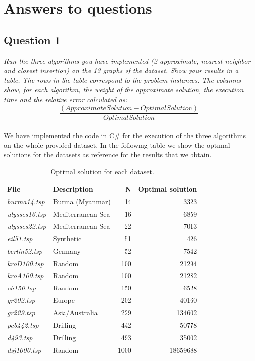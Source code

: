\section{Answers to questions}

\subsection{Question 1}
\textit{Run the three algorithms you have implemented (2-approximate, nearest neighbor and closest insertion) on the 13 graphs of the dataset. Show your results in a table. The rows in the table correspond to the problem instances. The columns show, for each algorithm, the weight of the approximate solution, the execution time and the relative error calculated as:
\[\frac{(ApproximateSolution - OptimalSolution)}{OptimalSolution}\]}\\

\noindent
We have implemented the code in C\# for the execution of the three algorithms on the whole provided dataset.
In the following table we show the optimal solutions for the datasets as reference for the results that we obtain.
\begin{table}[H]\centering
    \begin{tabular}{|l|l|r|r|}
    \hline
    \textbf{File} & \textbf{Description} & \textbf{N} & \textbf{Optimal solution} \\
    \hline
    \textit{burma14.tsp}	    & Burma (Myanmar)	& 14	& 3323 \\
    \textit{ulysses16.tsp}      & Mediterranean Sea & 16	& 6859 \\
    \textit{ulysses22.tsp}      & Mediterranean Sea & 22	& 7013 \\
    \textit{eil51.tsp}          & Synthetic	        & 51	& 426 \\
    \textit{berlin52.tsp}	    & Germany	        & 52 	& 7542 \\
    \textit{kroD100.tsp}	    & Random	        & 100	& 21294 \\
    \textit{kroA100.tsp}	    & Random 	        & 100	& 21282 \\
    \textit{ch150.tsp}	        & Random	        & 150	& 6528 \\
    \textit{gr202.tsp}	        & Europe	        & 202   & 40160 \\
    \textit{gr229.tsp}	        & Asia/Australia	& 229	& 134602 \\
    \textit{pcb442.tsp}         & Drilling		    & 442 	& 50778 \\
    \textit{d493.tsp}	        & Drilling	        & 493	& 35002 \\
    \textit{dsj1000.tsp}	    & Random	        & 1000 	& 18659688 \\
    \hline
    \end{tabular}
    \caption{Optimal solution for each dataset.}
\end{table}

